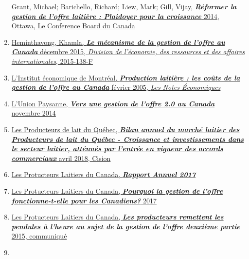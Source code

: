 \documentclass[11pt]{article}
\begin{document}
\begin{enumerate}
  \href{https://www.conferenceboard.ca/e-library/abstract.aspx?did=6084}{Grant,
  Michael; Barichello, Richard; Liew, Mark; Gill, Vijay,
  \textbf{\emph{Réformer la gestion de l'offre laitière : Plaidoyer pour
  la croissance}} 2014, Ottawa, Le Conference Board du Canada}
\item
  \href{https://bdp.parl.ca/Content/LOP/ResearchPublications/2015-138-f.html?cat=agriculture}{Heminthavong,
  Khamla, \textbf{\emph{Le mécanisme de la gestion de l'offre au
  Canada}} décembre 2015, \emph{Division de l'économie, des ressources
  et des affaires internationales}, 2015-138-F}
\item
  \href{http://www.caaaq.gouv.qc.ca/userfiles/File/MEIDairy\%20fev05_FRENCH.pdf}{L'Institut
  économique de Montréal, \textbf{\emph{Production laitière : les coûts
  de la gestion de l'offre au Canada}} février 2005, \emph{Les Notes
  Économiques}}
\item
  \href{https://unionpaysanne.com/publications/}{L'Union Paysanne,
  \textbf{\emph{Vers une gestion de l'offre 2.0 au Canada}} novembre
  2014}
\item
  \href{https://www.newswire.ca/fr/news-releases/bilan-annuel-du-marche-laitier-des-producteurs-de-lait-du-quebec---croissance-et-investissements-dans-le-secteur-laitier-attenues-par-lentree-en-vigueur-des-accords-commerciaux-679406953.html}{Les
  Producteurs de lait du Québec, \textbf{\emph{Bilan annuel du marché
  laitier des Producteurs de lait du Québec - Croissance et
  investissements dans le secteur laitier, atténués par l'entrée en
  vigueur des accords commerciaux}} avril 2018, Cision}
\item
  \href{http://lait.org/notre-organisation/rapport-annuel/}{Les
  Protucteurs Laitiers du Canada, \textbf{\emph{Rapport Annuel 2017}}}
\item
  \href{https://www.producteurslaitiers.ca/que-faisons-nous/a-propos-de-la-gestion-de-l-offre/pourquoi-la-gestion-de-l-offre-fonctionne-t-elle-pour-les-canadiens}{Les
  Protucteurs Laitiers du Canada, \textbf{\emph{Pourquoi la gestion de
  l'offre fonctionne-t-elle pour les Canadiens?}} 2017}
\item
  \href{https://www.producteurslaitiers.ca/salle-de-presse/nouvelles/politique/les-producteurs-remettent-les-pendules-a-l-heure-au-sujet-de-la-gestion-de-l-offre-deuxieme-partie}{Les
  Protucteurs Laitiers du Canada, \textbf{\emph{Les producteurs
  remettent les pendules à l'heure au sujet de la gestion de l'offre
  deuxième partie}} 2015, communiqué}
\item

\end{enumerate}
\end{document}
